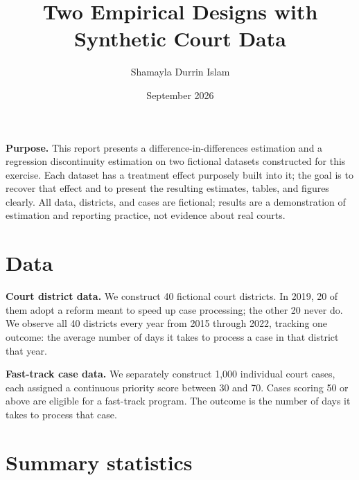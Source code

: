 \documentclass[11pt]{article}
\title{Two Empirical Designs with Synthetic Court Data}
\author{Shamayla Durrin Islam}
\date{September 2026}
\begin{document}
\maketitle

\textbf{Purpose.} This report presents a difference-in-differences
estimation and a regression discontinuity estimation on two fictional
datasets constructed for this exercise. Each dataset has a treatment effect
purposely built into it; the goal is to recover that effect and to present
the resulting estimates, tables, and figures clearly. All data, districts,
and cases are fictional; results are a demonstration of estimation and
reporting practice, not evidence about real courts.

\section*{Data}

\textbf{Court district data.} We construct 40 fictional court districts.
In 2019, 20 of them adopt a reform meant to speed up case processing; the
other 20 never do. We observe all 40 districts every year from 2015 through
2022, tracking one outcome: the average number of days it takes to process
a case in that district that year.

\textbf{Fast-track case data.} We separately construct 1,000 individual
court cases, each assigned a continuous priority score between 30 and 70.
Cases scoring 50 or above are eligible for a fast-track program. The
outcome is the number of days it takes to process that case.

\section*{Summary statistics}
\end{document}
